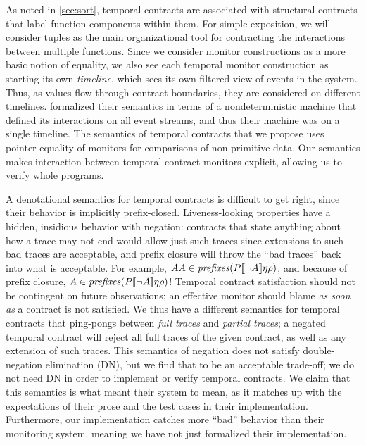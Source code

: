 %
As noted in \autoref{sec:sort}, temporal contracts are associated with structural contracts that label function components within them.
%
For simple exposition, we will consider tuples as the main organizational tool for contracting the interactions between multiple functions.
%
Since we consider monitor constructions as a more basic notion of equality, we also see each temporal monitor construction as starting its own \emph{timeline}, which sees its own filtered view of events in the system.
%
Thus, as values flow through contract boundaries, they are considered on different timelines.
%
\dfm formalized their semantics in terms of a nondeterministic machine that defined its interactions on all event streams, and thus their machine was on a single timeline.
%
The semantics of temporal contracts that we propose uses pointer-equality of monitors for comparisons of non-primitive data.
%
Our semantics makes interaction between temporal contract monitors explicit, allowing us to verify whole programs.

A denotational semantics for temporal contracts is difficult to get right, since their behavior is implicitly prefix-closed.
%
Liveness-looking properties have a hidden, insidious behavior with negation: contracts that state anything about how a trace may not end would allow just such traces since extensions to such bad traces are acceptable, and prefix closure will throw the ``bad traces'' back into what is acceptable.
%
For example, $AA \in \mathit{prefixes}(P[\![ \neg A ]\!]{\eta}{\rho})$, and because of prefix closure, $A \in \mathit{prefixes}(P[\![ \neg A ]\!]{\eta}{\rho})$!
%
Temporal contract satisfaction should not be contingent on future observations; an effective monitor should blame \emph{as soon as} a contract is not satisfied.
%
We thus have a different semantics for temporal contracts that ping-pongs between \emph{full traces} and \emph{partial traces}; a negated temporal contract will reject all full traces of the given contract, as well as any extension of such traces.
%
This semantics of negation does not satisfy double-negation elimination (DN), but we find that to be an acceptable trade-off; we do not need DN in order to implement or verify temporal contracts.
%
We claim that this semantics is what \dfm meant their system to mean, as it matches up with the expectations of their prose and the test cases in their implementation.
%
Furthermore, our implementation catches more ``bad'' behavior than their monitoring system, meaning we have not just formalized their implementation.

